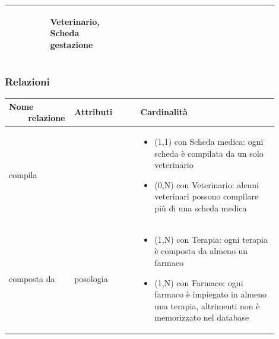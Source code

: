 \documentclass[12pt,a4paper]{article}
\begin{document}
\begin{center}
\begin{longtable}{|p{0.14\linewidth}|p{0.20\linewidth}|p{0.36\linewidth}|p{0.20\linewidth}|}
\begin{itemize}
						
					\end{itemize}
					& \begin{flushleft}\vspace{-25pt} Veterinario, Scheda gestazione \end{flushleft} \\ 

\hline


\end{longtable}
\end{center}
\pagebreak
\subsubsection{Relazioni}
\label{Healthcare Relazioni}
\begin{center}

\setlength{\extrarowheight}{1.5pt}

\begin{longtable}{|p{0.16\linewidth}|p{0.24\linewidth}|p{0.50\linewidth}|}
\hline 
\textbf{Nome \ \ \ \ relazione} 	& \textbf{Attributi} & \textbf{Cardinalità}\\ 

    
\hline
compila 				& \begin{flushleft}\vspace{-15pt}  \end{flushleft}
					& \begin{itemize}
						\setlength{\itemindent}{-1em}
						\vspace{-25pt}
						\setlength\itemsep{-0.25em}
						\item (1,1) con Scheda medica: ogni scheda è compilata da un solo veterinario
						\item (0,N) con Veterinario: alcuni veterinari possono compilare più di una scheda medica
					\end{itemize}\\ 

\hline
composta da 				& \begin{flushleft}\vspace{-25pt} posologia \end{flushleft}
					& \begin{itemize}
						\setlength{\itemindent}{-1em}
						\vspace{-25pt}
						\setlength\itemsep{-0.25em}
						\item (1,N) con Terapia: ogni terapia è composta da almeno un farmaco
						\item (1,N) con Farmaco: ogni farmaco è impiegato in almeno una terapia, altrimenti non è memorizzato nel database
					\end{itemize}\\ 


\end{longtable}
\end{center}
\end{document}
